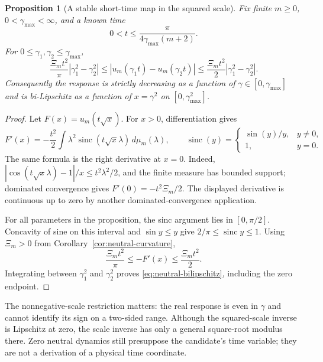\documentclass[11pt]{article}
\newtheorem{proposition}[theorem]{Proposition}
\theoremstyle{definition}
\begin{document}
\begin{proposition}[A stable short-time map in the squared scale]
\label{prop:neutral-monotonicity}
Fix finite $m\ge0$, $0<\gamma_{\max}<\infty$, and a known time
\begin{equation}
 0<t\le\frac{\pi}{4\gamma_{\max}(m+2)}.
 \label{eq:neutral-short-time}
\end{equation}
For $0\le\gamma_1,\gamma_2\le\gamma_{\max}$,
\begin{equation}
 \frac{\Xi_m t^2}{\pi}|\gamma_1^2-\gamma_2^2|
 \le |u_m(\gamma_1t)-u_m(\gamma_2t)|
 \le\frac{\Xi_m t^2}{2}|\gamma_1^2-\gamma_2^2|.
 \label{eq:neutral-bilipschitz}
\end{equation}
Consequently the response is strictly decreasing as a function of
$\gamma\in[0,\gamma_{\max}]$ and is bi-Lipschitz as a function of
$x=\gamma^2$ on $[0,\gamma_{\max}^2]$.
\end{proposition}
\begin{proof}
Let $F(x)=u_m(t\sqrt{x})$. For $x>0$, differentiation gives
\[
 F'(x)=-\frac{t^2}{2}\int\lambda^2
       \operatorname{sinc}(t\sqrt{x}\lambda)\,d\mu_m(\lambda),
 \qquad \operatorname{sinc}(y)=
 \begin{cases}\sin(y)/y,&y\ne0,\\1,&y=0.\end{cases}
\]
The same formula is the right derivative at $x=0$. Indeed,
$|\cos(t\sqrt{x}\lambda)-1|/x\le t^2\lambda^2/2$, and the
finite measure has bounded support; dominated convergence gives
$F'(0)=-t^2\Xi_m/2$. The displayed derivative is continuous up to
zero by another dominated-convergence application.

For all parameters in the proposition, the sinc argument lies in
$[0,\pi/2]$. Concavity of sine on this interval and
$\sin y\le y$ give $2/\pi\le\operatorname{sinc}y\le1$.
Using $\Xi_m>0$ from Corollary~\ref{cor:neutral-curvature},
\[
 \frac{\Xi_m t^2}{\pi}\le -F'(x)\le\frac{\Xi_m t^2}{2}.
\]
Integrating between $\gamma_1^2$ and $\gamma_2^2$ proves
\eqref{eq:neutral-bilipschitz}, including the zero endpoint.
\end{proof}

The nonnegative-scale restriction matters: the real response is even in
$\gamma$ and cannot identify its sign on a two-sided range.
Although the squared-scale inverse is Lipschitz at zero, the scale inverse
has only a general square-root modulus there. Zero neutral dynamics still
presuppose the candidate's time variable; they are not a derivation of a physical time coordinate.
\end{document}
